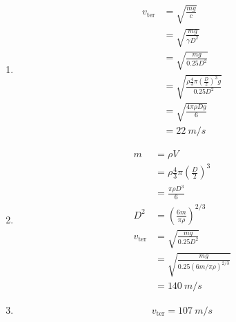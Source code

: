 \documentclass{article}
\begin{document}
\begin{enumerate}
  \item

        \begin{align*}
          v_\text{ter} & = \sqrt{\frac{m g}{c}}                                                        \\
                       & = \sqrt{\frac{m g}{\gamma D^2}}                                               \\
                       & = \sqrt{\frac{m g}{0.25 D^2}}                                                 \\
                       & = \sqrt{\frac{\rho \frac{4}{3} \pi \left( \frac{D}{2} \right)^3 g}{0.25 D^2}} \\
                       & = \sqrt{\frac{4 \pi \rho D g}{6}}                                             \\
                       & = \qty{22}{m/s}
        \end{align*}

  \item

        \begin{align*}
          m            & = \rho V                                            \\
                       & = \rho \frac{4}{3} \pi \left( \frac{D}{2} \right)^3 \\
                       & = \frac{\pi \rho D^3}{6}                            \\
          D^2          & = \left( \frac{6 m}{\pi \rho} \right)^{2 / 3}       \\
          v_\text{ter} & = \sqrt{\frac{m g}{0.25 D^2}}                       \\
                       & = \sqrt{\frac{m g}{0.25 (6 m / \pi \rho)^{2 / 3}}}  \\
                       & = \qty{140}{m/s}
        \end{align*}

  \item \[v_\text{ter} = \qty{107}{m/s}\]
\end{enumerate}

\setcounter{subsection}{26}
\subsection{}
\end{document}
